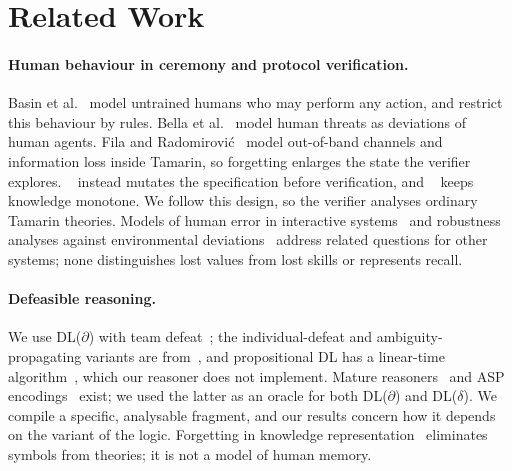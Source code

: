 \section{Related Work}
\label{sec:related}

\paragraph{Human behaviour in ceremony and protocol verification.} Basin et al.~\cite{basin2016modeling} model untrained humans who may perform any action, and restrict this behaviour by rules. Bella et al.~\cite{bella2022modelling} model human threats as deviations of human agents. Fila and Radomirovi\'c~\cite{fila2024nothing} model out-of-band channels and information loss inside Tamarin, so forgetting enlarges the state the verifier explores. \XMen{}~\cite{sempreboni2020x,sempreboni2023mutation,quamara2025user} instead mutates the specification before verification, and \forget~\SCP{} keeps knowledge monotone. We follow this design, so the verifier analyses ordinary Tamarin theories. Models of human error in interactive systems~\cite{curzon2007approach} and robustness analyses against environmental deviations~\cite{zhang2023fortis} address related questions for other systems; none distinguishes lost values from lost skills or represents recall.

\paragraph{Defeasible reasoning.} We use DL($\partial$) with team defeat~\cite{nute1994defeasible,antoniou2001representation}; the individual-defeat and ambiguity-propagating variants are from~\cite{billington1993defeasible,antoniou2000flexible,governatori2004argumentation}, and propositional DL has a linear-time algorithm~\cite{maher2001propositional}, which our reasoner does not implement. Mature reasoners~\cite{lam2009spindle} and ASP encodings~\cite{governatori2026ddl} exist; we used the latter as an oracle for both DL($\partial$) and DL($\delta$). We compile a specific, analysable fragment, and our results concern how it depends on the variant of the logic. Forgetting in knowledge representation~\cite{lin1994forget,eiter2019brief} eliminates symbols from theories; it is not a model of human memory.

